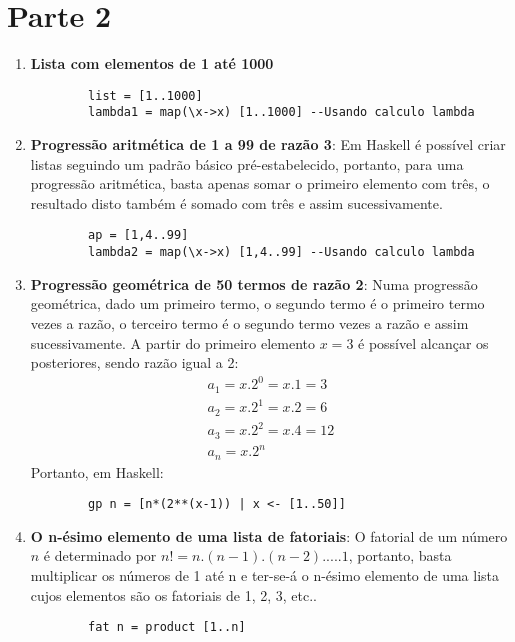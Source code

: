 \documentclass{article}
\begin{document}
\section*{Parte 2}
    \begin{enumerate}
        \item \textbf{Lista com elementos de 1 até 1000}
        \begin{lstlisting}
        list = [1..1000]
        lambda1 = map(\x->x) [1..1000] --Usando calculo lambda
        \end{lstlisting}
        
        \item \textbf{Progressão aritmética de 1 a 99 de razão 3}: Em Haskell é possível criar listas seguindo um padrão básico pré-estabelecido, portanto, para uma progressão aritmética, basta apenas somar o primeiro elemento com três, o resultado disto também é somado com três e assim sucessivamente. 
        \begin{lstlisting}
        ap = [1,4..99]
        lambda2 = map(\x->x) [1,4..99] --Usando calculo lambda
        \end{lstlisting}
        
        \item \textbf{Progressão geométrica de 50 termos de razão 2}: Numa progressão geométrica, dado um primeiro termo, o segundo termo é o primeiro termo vezes a razão, o terceiro termo é o segundo termo vezes a razão e assim sucessivamente. A partir do primeiro elemento $x = 3$ é possível alcançar os posteriores, sendo razão igual a 2:
        \begin{gather*}
            a_{1} = x.2^{0} = x.1  = 3\\
            a_{2} = x.2^{1} = x.2  = 6\\
            a_{3} = x.2^{2} = x.4  = 12\\
            a_{n} = x.2^{n}
        \end{gather*}
        Portanto, em Haskell:
        \begin{lstlisting}
        gp n = [n*(2**(x-1)) | x <- [1..50]]
        \end{lstlisting}
        
        \item \textbf{O n-ésimo elemento de uma lista de fatoriais}: O fatorial de um número $n$ é determinado por $n! = n.(n-1).(n-2) . ... .1$, portanto, basta multiplicar os números de 1 até n e ter-se-á o n-ésimo elemento de uma lista cujos elementos são os fatoriais de 1, 2, 3, etc..
        \begin{lstlisting}
        fat n = product [1..n]
        \end{lstlisting}
    \end{enumerate}
\end{document}
